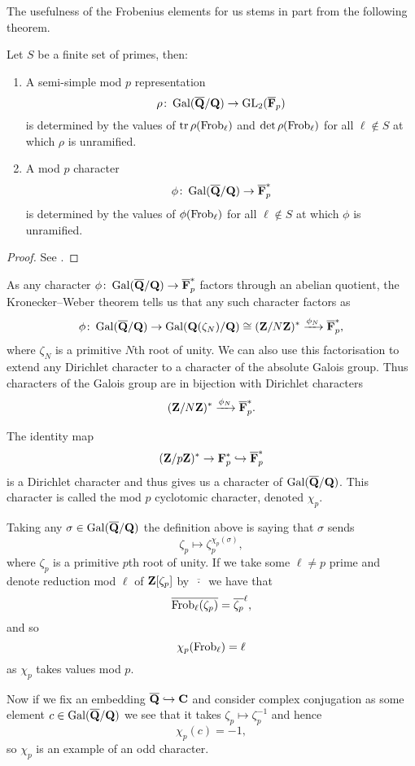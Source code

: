 \documentclass[a4paper,12pt]{article}
\begin{document}
The usefulness of the Frobenius elements for us stems in part from the following theorem.

\begin{thm}\label{thm:cheb}
Let $S$ be a finite set of primes, then:
\begin{enumerate}
\item A semi-simple mod $p$ representation
\[
\rho\colon \operatorname{Gal}(\overline{\mathbf{Q}}/\mathbf{Q}) \to \operatorname{GL}_2(\overline{\mathbf{F}}_p)
\]
is determined by the values of $\operatorname{tr}\rho(\operatorname{Frob}_\ell)$ and $\det\rho(\operatorname{Frob}_\ell)$ for all $\ell\not\in S$ at which $\rho$ is unramified.

\item A mod $p$ character
\[
\phi\colon \operatorname{Gal}(\overline{\mathbf{Q}}/\mathbf{Q}) \to \overline{\mathbf{F}}_p^*
\]
is determined by the values of $\phi(\operatorname{Frob}_\ell)$ for all $\ell\not\in S$ at which $\phi$ is unramified.
\end{enumerate}

\end{thm}
\begin{proof}
See \cite[prop. 25]{DDT}.
\end{proof}


As any character $\phi\colon\operatorname{Gal}(\overline{\mathbf{Q}}/\mathbf{Q}) \to \overline{\mathbf{F}}_p^*$ factors through an abelian quotient, the Kronecker--Weber theorem tells us that any such character factors as
\[
\phi\colon\operatorname{Gal}(\overline{\mathbf{Q}}/\mathbf{Q}) \to \operatorname{Gal}(\mathbf{Q}(\zeta_N)/\mathbf{Q})\cong (\mathbf{Z}/N\mathbf{Z})^*\xrightarrow{\phi_N}\overline{\mathbf{F}}_p^*,
\]
where $\zeta_N$ is a primitive $N$th root of unity.
We can also use this factorisation to extend any Dirichlet character to a character of the absolute Galois group.
Thus characters of the Galois group are in bijection with Dirichlet characters
\[
(\mathbf{Z}/N\mathbf{Z})^* \xrightarrow{\phi_N}\overline{\mathbf{F}}_p^*.
\]



\begin{defn}
The identity map
\[
(\mathbf{Z}/p\mathbf{Z})^* \to \mathbf{F}_p^* \hookrightarrow \overline{\mathbf{F}}_p^*
\]
is a Dirichlet character and thus gives us a character of $\operatorname{Gal}(\overline{\mathbf{Q}}/\mathbf{Q})$.
This character is called the mod $p$ cyclotomic character, denoted $\chi_p$.
\end{defn}

\begin{rmk}
Taking any $\sigma\in\operatorname{Gal}(\overline{\mathbf{Q}}/\mathbf{Q})$ the definition above is saying that $\sigma$ sends
\[
\zeta_p\mapsto \zeta_p^{\chi_p(\sigma)},
\]
where $\zeta_p$ is a primitive $p$th root of unity.
If we take some $\ell \ne p$ prime and denote reduction mod $\ell$ of $\mathbf{Z}[\zeta_p]$ by $\overline{\ \cdot\ }$ we have that
\[
\overline{\operatorname{Frob}_\ell(\zeta_p)} = \overline{\zeta_p}^\ell,
\]
and so
\[
\chi_p(\operatorname{Frob}_\ell) = \ell
\]
as $\chi_p$ takes values mod $p$.

Now if we fix an embedding $\overline{\mathbf{Q}}\hookrightarrow\mathbf{C}$ and consider complex conjugation as some element $c\in\operatorname{Gal}(\overline{\mathbf{Q}}/\mathbf{Q})$ we see that it takes $\zeta_p \mapsto\zeta_p^{-1}$ and hence
\[
\chi_p(c) = -1,
\]
so $\chi_p$ is an example of an odd character.
\end{rmk}
\end{document}
